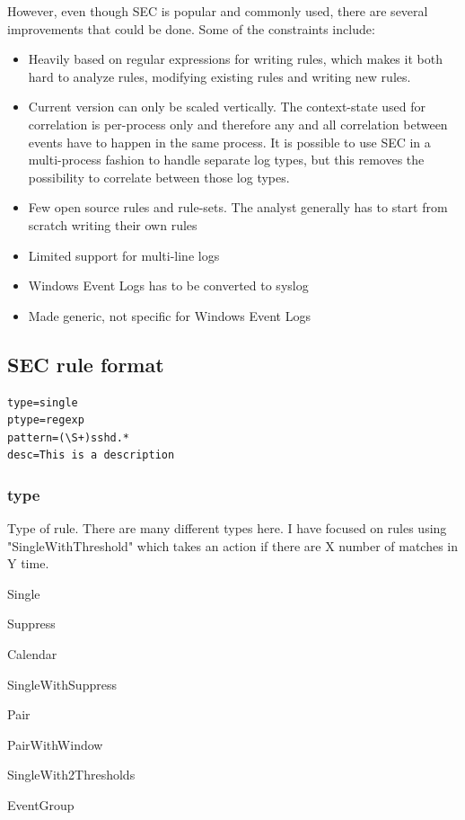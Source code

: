 However, even though SEC is popular and commonly used, there are several improvements that could be done. Some of the constraints include:
\begin{itemize}
    \item Heavily based on regular expressions for writing rules, which makes it both hard to analyze rules, modifying existing rules and writing new rules.
    \item Current version can only be scaled vertically. The context-state used for correlation is per-process only and therefore any and all correlation between events have to happen in the same process. It is possible to use SEC in a multi-process fashion to handle separate log types, but this removes the possibility to correlate between those log types. 
    \item Few open source rules and rule-sets. The analyst generally has to start from scratch writing their own rules
    \item Limited support for multi-line logs
    \item Windows Event Logs has to be converted to syslog
    \item Made generic, not specific for Windows Event Logs
\end{itemize}


\subsection{SEC rule format}
\begin{lstlisting}
type=single
ptype=regexp
pattern=(\S+)sshd.*
desc=This is a description
\end{lstlisting}

\subsubsection{type}
Type of rule. There are many different types here.
I have focused on rules using "SingleWithThreshold" which takes an action if there are X number of matches in Y time.

Single

Suppress

Calendar

SingleWithSuppress

Pair

PairWithWindow

SingleWith2Thresholds

EventGroup


